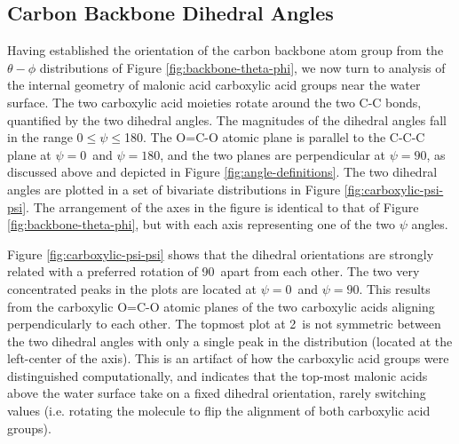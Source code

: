\subsection {Carbon Backbone Dihedral Angles}

Having established the orientation of the carbon backbone atom group from the $\theta-\phi$ distributions of Figure \ref{fig:backbone-theta-phi}, we now turn to analysis of the  internal geometry of malonic acid carboxylic acid groups near the water surface. The two carboxylic acid moieties rotate around the two C-C bonds, quantified by the two dihedral angles. The magnitudes of the dihedral angles fall in the range 0\textdegree$\le \psi \le$180\textdegree. The O=C-O atomic plane is parallel to the C-C-C plane at $\psi=0$\textdegree~and $\psi=180$\textdegree, and the two planes are perpendicular at $\psi=90$\textdegree, as discussed above and depicted in Figure \ref{fig:angle-definitions}. The two dihedral angles are plotted in a set of bivariate distributions in Figure \ref{fig:carboxylic-psi-psi}. The arrangement of the axes in the figure is identical to that of Figure \ref{fig:backbone-theta-phi}, but with each axis representing one of the two $\psi$ angles.

Figure \ref{fig:carboxylic-psi-psi} shows that the dihedral orientations are strongly related with a preferred rotation of 90\textdegree~apart from each other. The two very concentrated peaks in the plots are located at $\psi=0$\textdegree~and $\psi=90$\textdegree. This results from the carboxylic O=C-O atomic planes of the two carboxylic acids aligning perpendicularly to each other. The topmost plot at 2\angs~is not symmetric between the two dihedral angles with only a single peak in the distribution (located at the left-center of the axis). This is an artifact of how the carboxylic acid groups were distinguished computationally, and indicates that the top-most malonic acids above the water surface take on a fixed dihedral orientation, rarely switching values (i.e. rotating the molecule to flip the alignment of both carboxylic acid groups).


